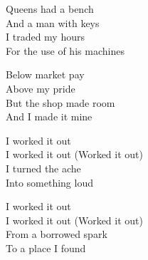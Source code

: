 \begin{lyrics}
Queens had a bench\\
And a man with keys\\
I traded my hours\\
For the use of his machines

Below market pay\\
Above my pride\\
But the shop made room\\
And I made it mine

I worked it out\\
I worked it out
(Worked it out)\\
I turned the ache\\
Into something loud

I worked it out\\
I worked it out
(Worked it out)\\
From a borrowed spark\\
To a place I found
\end{lyrics}


